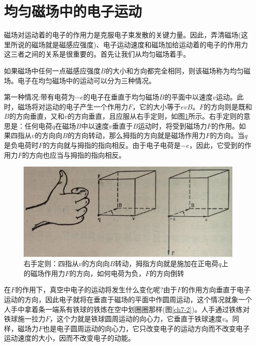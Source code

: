 \section{均匀磁场中的电子运动}


磁场对运动着的电子的作用力是克服电子束发散的关键力量。因此，弄清磁场(这里所说的磁场就是磁感应强度)、电子运动速度和磁场加给运动着的电子的作用力这三者之间的关系是很重要的。首先让我们从均匀磁场着手。

如果磁场中任何一点磁感应强度$ B $的大小和方向都完全相同，则该磁场称为均匀磁场。电子在均匀磁场中的运动可以分为三种情况。

第一种情况:带有电荷为$ -e $的电子在垂直于均匀磁场$ B $的平面中以速度$ v $运动。此时，磁场将对运动的电子产生一个作用力$ F $，它的大小等于$ evB $。$ F $的方向则是既和$ B $的方向垂直，又和$ v $的方向垂直，且应服从右手定则，如图\ref{ch7-1}所示。右手定则的意思是：任何电荷$ q $在磁场$ B $中以速度$ v $垂直于$ B $运动时，将受到磁场力$ F $的作用。如果四指从$ v $的方向向$ B $的方向转动，那么拇指的方向就是磁场作用力$ F $的方向。当$ q $是负电荷时$ F $的方向就与拇指的指向相反。由于电子电荷是$ -e $，因此，它受到的作用力$ F $的方向也应当与拇指的指向相反。

\begin{figure}[phtb]
	\centering
	\includegraphics[width=0.8\linewidth]{figure/ch7-1}
	\caption{ 右手定则：四指从$ v $的方向向$ B $转动，拇指方向就是施加在正电荷$ q $上的磁场作用力$ F $的方向，如何电荷为负，$ F $的方向倒转}
	\label{ch7-1}
\end{figure}

在$ F $的作用下，真空中电子的运动将发生什么变化呢?由于$ F $的作用方向垂直于电子运动的方向，因此电子就将在垂直于磁场的平面中作圆周运动，这个情况就象一个人手中拿着条一端系有铁球的铁炼在空中划圈圈那样(图\ref{ch7-2})。人手通过铁练对铁球施一拉力$ F $，这个力就是铁球圆周运动的向心力，它垂直于铁球速度$ v $。同样，磁场力$ F $也是电子圆周运动的向心力，它只改变电子的运动方向而不改变电子运动速度的大小，因而不改变电子的动能。


